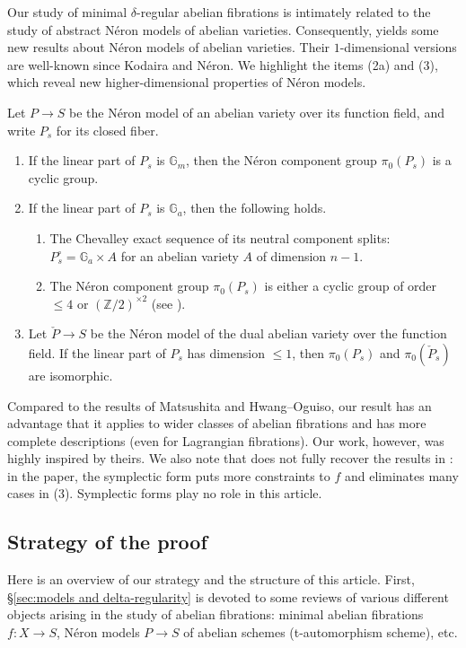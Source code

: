 \documentclass[reqno, letterpaper]{amsart}
\numberwithin{equation}{subsection}
\let\to\longrightarrow
\newcommand{\GG}{\mathbb{G}}
\newcommand{\ZZ}{\mathbb{Z}}
\begin{document}
	Our study of minimal $\delta$-regular abelian fibrations is intimately related to the study of abstract N\'eron models of abelian varieties. Consequently,  yields some new results about N\'eron models of abelian varieties. Their $1$-dimensional versions are well-known since Kodaira and N\'eron. We highlight the items (2a) and (3), which reveal new higher-dimensional properties of N\'eron models.
	
	\begin{theorem}  \label{thm:main 2}
		Let $P \to S$ be the N\'eron model of an abelian variety over its function field, and write $P_s$ for its closed fiber.
		\begin{enumerate}
			\item If the linear part of $P_s$ is $\GG_m$, then the N\'eron component group $\pi_0(P_s)$ is a cyclic group.
			\item If the linear part of $P_s$ is $\GG_a$, then the following holds.
			\begin{enumerate}
				\item The Chevalley exact sequence of its neutral component splits: $P^\circ_s = \GG_a \times A$ for an abelian variety $A$ of dimension $n-1$.
				\item The N\'eron component group $\pi_0(P_s)$ is either a cyclic group of order $\le 4$ or $(\ZZ/2)^{\times 2}$ (see ).
			\end{enumerate}
			\item Let $\check P \to S$ be the N\'eron model of the dual abelian variety over the function field. If the linear part of $P_s$ has dimension $\le 1$, then $\pi_0(P_s)$ and $\pi_0(\check P_s)$ are isomorphic.
		\end{enumerate}
	\end{theorem}
	
	Compared to the results of Matsushita and Hwang--Oguiso, our result has an advantage that it applies to wider classes of abelian fibrations and has more complete descriptions (even for Lagrangian fibrations). Our work, however, was highly inspired by theirs. We also note that  does not fully recover the results in \cite[Theorem~1.1]{hwang-ogu11}: in the paper, the symplectic form puts more constraints to $f$ and eliminates many cases in (3). Symplectic forms play no role in this article.
	
	
	
	\subsection{Strategy of the proof}
		Here is an overview of our strategy and the structure of this article. First, \S \ref{sec:models and delta-regularity} is devoted to some reviews of various different objects arising in the study of abelian fibrations: minimal abelian fibrations $f : X \to S$, N\'eron models $P \to S$ of abelian schemes (t-automorphism scheme), etc.
		
\end{document}
